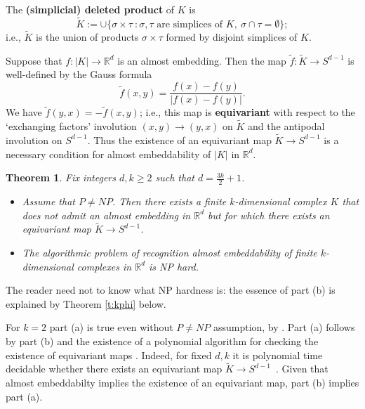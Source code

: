\documentclass[runningheads]{llncs}
\newtheorem{theorem}{Theorem}
\newtheorem{corollary}[theorem]{Corollary}
\theoremstyle{remark}
\theoremstyle{definition}
\newcommand{\R}{\mathbb{R}}
\def\t{\widetilde}
\begin{document}
The {\bf (simplicial) deleted product} of $K$ is
\[
\t K:= \cup \{ \sigma\times\tau\ : \sigma,\tau \textrm{ are  simplices of }K,\
\sigma\cap\tau=\emptyset\};
\]
i.e., $\t K$ is the union of products $\sigma\times\tau$ formed by disjoint simplices of $K$.

Suppose that $f:|K|\to\R^d$ is an almost embedding.
Then the map $\t f:\t K\to S^{d-1}$ is well-defined by the Gauss formula
$$\t f(x,y)=\frac{f(x)-f(y)}{|f(x)-f(y)|}.$$
We have $\t f(y,x)=-\t f(x,y)$;
i.e., this map is {\bf equivariant} with respect to the `exchanging factors' involution
$(x,y)\to(y,x)$ on $\t K$ and the antipodal involution on $S^{d-1}$.
Thus the existence of an equivariant map $\t K\to S^{d-1}$ is a
necessary condition for almost embeddability of $|K|$ in $\R^d$.

\begin{theorem}\label{t:nphard}
Fix integers $d,k\ge2$ such that $d=\frac{3k}2+1$.

\begin{itemize}
  \item[$(a)$] Assume that $P\ne NP$.
Then there exists a finite $k$-dimensional complex $K$ that does not admit an almost embedding in $\R^d$ but for which there exists an equivariant map $\t K\to S^{d-1}$.

\item[$(b)$] The algorithmic problem of recognition almost embeddability of finite $k$-dimensional complexes in
$\R^d$ is NP hard.
\end{itemize}
\end{theorem}

The reader need not to know what NP hardness is: the  essence of part (b) is explained by Theorem \ref{t:kphi} below.

For $k=2$ part (a) is true even without $P\ne NP$ assumption, by \cite[Theorem 1.5 and Proposition 1.7]{AMSW}.
Part (a) follows by part (b) and the existence of a polynomial algorithm for checking the existence of equivariant maps \cite{CKV}.
Indeed, for fixed $d,k$
it is polynomial time decidable whether there exists an equivariant map $\t K\to S^{d-1}$~\cite{CKV}.
Given that almost embeddabilty implies the existence of an equivariant map, part (b) implies part (a).
\end{document}
